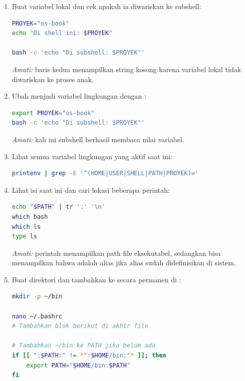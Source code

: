 \begin{enumerate}
    \item Buat variabel lokal dan cek apakah ia diwariskan ke subshell:
\begin{lstlisting}[language=bash, caption={Variabel lokal tidak diwariskan ke subshell}]
PROYEK="os-book"
echo "Di shell ini: $PROYEK"

bash -c 'echo "Di subshell: $PROYEK"'
\end{lstlisting}
    \textit{Amati:} baris kedua menampilkan string kosong karena variabel
    lokal tidak diwariskan ke proses anak.

    \item Ubah menjadi variabel lingkungan dengan :
\begin{lstlisting}[language=bash, caption={Variabel lingkungan diwariskan ke subshell}]
export PROYEK="os-book"
bash -c 'echo "Di subshell: $PROYEK"'
\end{lstlisting}
    \textit{Amati:} kali ini subshell berhasil membaca nilai variabel.

    \item Lihat semua variabel lingkungan yang aktif saat ini:
\begin{lstlisting}[language=bash, caption={Melihat variabel lingkungan}]
printenv | grep -E '^(HOME|USER|SHELL|PATH|PROYEK)='
\end{lstlisting}

    \item Lihat isi  saat ini dan cari lokasi beberapa perintah:
\begin{lstlisting}[language=bash, caption={Melihat PATH dan lokasi perintah}]
echo "$PATH" | tr ':' '\n'
which bash
which ls
type ls
\end{lstlisting}
    \textit{Amati:} perintah  menampilkan path file eksekutabel,
    sedangkan  bisa menampilkan bahwa  adalah alias
    jika alias sudah didefinisikan di sistem.

    \item Buat direktori  dan tambahkan ke  secara
          permanen di :
\begin{lstlisting}[language=bash, caption={Menambahkan ~/bin ke PATH}]
mkdir -p ~/bin

nano ~/.bashrc
# Tambahkan blok berikut di akhir file

# Tambahkan ~/bin ke PATH jika belum ada
if [[ ":$PATH:" != *":$HOME/bin:"* ]]; then
    export PATH="$HOME/bin:$PATH"
fi


\end{lstlisting}
\end{enumerate}
